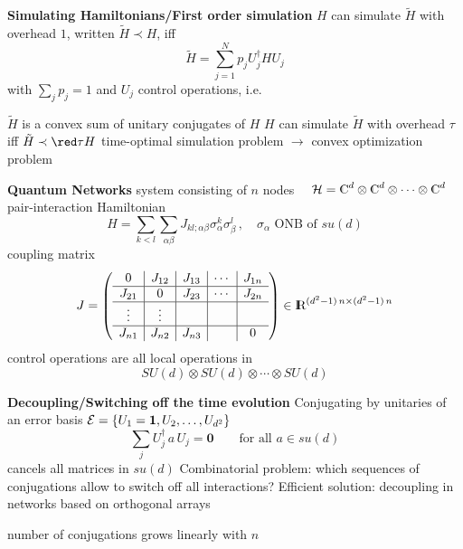 \documentclass[portrait]{seminar}
\begin{document}
\begin{slide}
{\large {\bf Simulating Hamiltonians/First order simulation}}
\vfill
{\blue $H$ can simulate $\tilde{H}$ with overhead $1$}, 
written $\tilde{H}\prec H$, iff 
\[
\tilde{H}=\sum_{j=1}^N p_j U_j^\dagger H U_j
\]
with $\sum_j p_j = 1$ and $U_j$ control operations, i.e.

{\red $\tilde{H}$ is a convex sum of unitary conjugates of $H$}
\vfill
$H$ can simulate $\tilde{H}$ with overhead {\red $\tau$} iff 
$\tilde{H} \prec {\red \tau} H$ 
\vfill 
{\red time-optimal simulation} problem $\longrightarrow$
{\red convex optimization} problem 
\vfill
\end{slide}

\begin{slide}
{\large {\bf Quantum Networks}}
\vfill
system consisting of {\blue $n$ nodes}  
$\quad {\cal H}=\C^d\otimes\C^d\otimes\cdots\otimes\C^d$ 
\vfill
{\blue pair-interaction Hamiltonian}
\[
H = \sum_{k<l} \sum_{\alpha\beta} J_{kl;\alpha\beta} 
\sigma_\alpha^k\sigma_\beta^l\,,\quad \sigma_\alpha \mbox{ ONB of } su(d)
\]
{\blue coupling matrix}
\[
J=\left(
\begin{array}{c|c|c|c|c}
0      & J_{12} & J_{13} & \cdots & J_{1n} \\ \hline
J_{21} & 0      & J_{23} & \cdots & J_{2n} \\ \hline
\vdots & \vdots &        &        &        \\ \hline
J_{n1} & J_{n2} & J_{n3} &        & 0 
\end{array}
\right)\in\R^{(d^2-1)\,n\times (d^2-1)\,n}
\]
{\blue control operations} are all {\red local} operations in
\[
SU(d)\otimes SU(d)\otimes\cdots\otimes SU(d)
\]
\end{slide}

\begin{slide}
{\bf Decoupling/Switching off the time evolution} 
\vfill 
Conjugating by unitaries of an {\blue error basis} ${\cal E}=\{U_1={\mathbf
1},U_2,\ldots,U_{d^2}\}$
\[
\sum_j U_j^\dagger\, a\, U_j = {\mathbf 0}\quad\quad
\mbox{for all } a\in su(d)
\]
cancels all matrices in $su(d)$
\vfill
Combinatorial problem: which sequences of conjugations allow to switch off
all interactions?
\vfill
Efficient solution: decoupling in networks based on
{\blue orthogonal arrays} 

number of conjugations grows linearly with $n$
\vfill
\end{slide}
\end{document}
